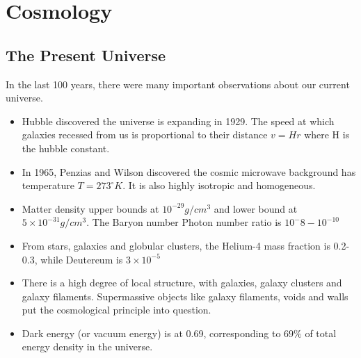\documentclass[11pt]{article}
\begin{document}
\section{Cosmology}
\subsection{The Present Universe}
In the last 100 years, there were many important observations about our current universe.
\begin{itemize}
    \item Hubble discovered the universe is expanding in 1929. The speed at which galaxies recessed from us is proportional to their distance $v = Hr$ where H is the hubble constant.
    \item In 1965, Penzias and Wilson discovered the cosmic microwave background has temperature $T = 273^{\circ} K$. It is also highly isotropic and homogeneous. 
    \item Matter density upper bounds at $10^{-29} g/cm^3$ and lower bound at $5 \times 10^{-31}g/cm^3$. The Baryon number Photon number ratio is $10^-{8} - 10^{-10}$
    \item From stars, galaxies and globular clusters, the Helium-4 mass fraction is 0.2-0.3, while Deutereum is $3 \times 10^{-5}$
    \item There is a high degree of local structure, with galaxies, galaxy clusters and galaxy filaments. Supermassive objects like galaxy filaments, voids and walls
    put the cosmological principle into question.
    \item Dark energy (or vacuum energy) is at 0.69, corresponding to $69\%$ of total energy density in the universe.
\end{itemize}
\end{document}
